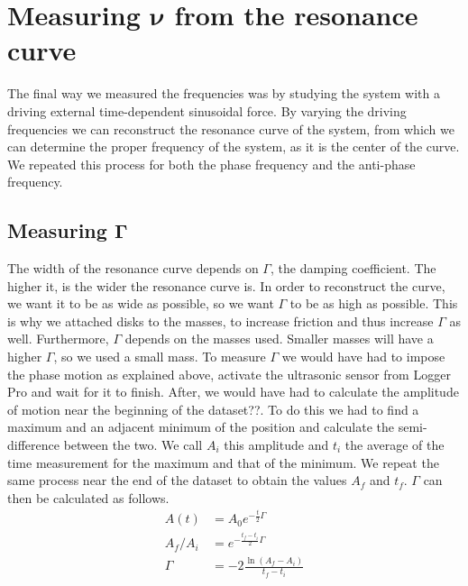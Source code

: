 \documentclass{article}
\begin{document}
\section{Measuring $ \bm \nu $ from the resonance curve}
The final way we measured the frequencies was by studying the system with a driving external time-dependent sinusoidal force. By varying the driving frequencies we can reconstruct the resonance curve of the system, from which we can determine the proper frequency of the system, as it is the center of the curve. We repeated this process for both the phase frequency and the anti-phase frequency.


\subsection{Measuring $\bm \Gamma$}
The width of the resonance curve depends on $\Gamma$, the damping coefficient. The higher it, is the wider the resonance curve is. In order to reconstruct the curve, we want it to be as wide as possible, so we want $\Gamma$ to be as high as possible. This is why we attached disks to the masses, to increase friction and thus increase $\Gamma$ as well. Furthermore, $\Gamma$ depends on the masses used. Smaller masses will have a higher $\Gamma$, so we used a small mass. %
To measure $\Gamma$ we would have had to impose the phase motion as explained above, activate the ultrasonic sensor from Logger Pro and wait for it to finish. After, we would have had to calculate the amplitude of motion near the beginning of the dataset??. To do this we had to find a maximum and an adjacent minimum of the position and calculate the semi-difference between the two. We call $A_i$ this amplitude and $t_i$ the average of the time measurement for the maximum and that of the minimum. We repeat the same process near the end of the dataset to obtain the values $A_f$ and $t_f$. $\Gamma$ can then be calculated as follows.
\begin{align}
    A(t) &= A_0 e^{-\frac{t}{2} \Gamma} \\
    A_f / A_i &= e^{-\frac{t_f-t_i}{2} \Gamma} \\
    \Gamma &= -2 \frac{ \ln(A_f - A_i) }{ t_f-t_i }
\end{align}
\end{document}

